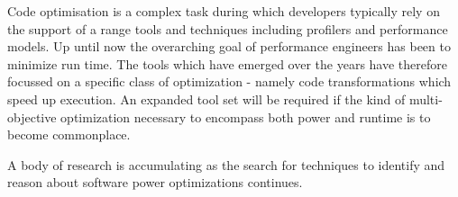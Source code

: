 Code optimisation is a complex task during which developers typically rely on the support of a range tools and techniques including profilers and performance models. Up until now the overarching goal of performance engineers has been to minimize run time. The tools which have emerged over the years have therefore focussed on a specific class of optimization - namely code transformations which speed up execution. An expanded tool set will be required if the kind of multi-objective optimization necessary to encompass both power and runtime is to become commonplace.

A body of research is accumulating as the search for techniques to identify and reason about software power optimizations continues.
